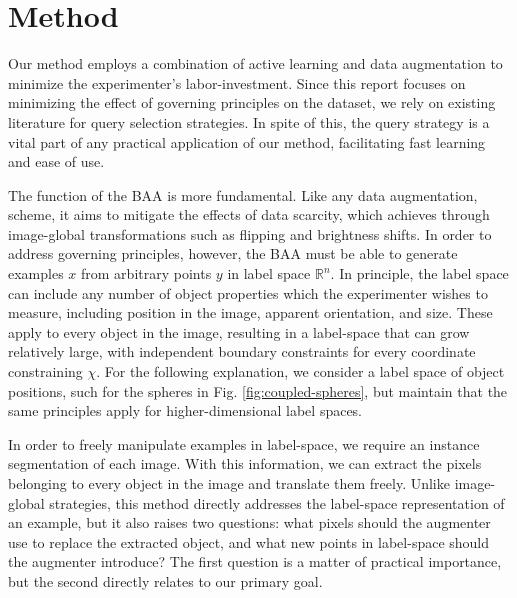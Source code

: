 \documentclass[10pt, journal]{IEEEtran}
\begin{document}
\section{Method}
\label{sec:method}

Our method employs a combination of active learning and data augmentation to
minimize the experimenter's labor-investment. Since this report focuses on
minimizing the effect of governing principles on the dataset, we rely on
existing literature \cite{settles_active_2012, vezhnevets_active_2012} for query
selection strategies. In spite of this, the query strategy is a vital part of
any practical application of our method, facilitating fast learning and ease of
use.

The function of the BAA is more fundamental. Like any data augmentation, scheme,
it aims to mitigate the effects of data scarcity, which
\cite{krizhevsky_imagenet_2012} achieves through image-global transformations
such as flipping and brightness shifts. In order to address governing
principles, however, the BAA must be able to generate examples $x$ from
arbitrary points $y$ in label space $\mathbb{R}^n$. In principle, the label
space can include any number of object properties which the experimenter wishes
to measure, including position in the image, apparent orientation, and
size. These apply to every object in the image, resulting in a label-space that
can grow relatively large, with independent boundary constraints for every
coordinate constraining $\chi$. For the following explanation, we consider a
label space of object positions, such for the spheres in
Fig. \ref{fig:coupled-spheres}, but maintain that the same principles apply for
higher-dimensional label spaces.

In order to freely manipulate examples in label-space, we require an instance
segmentation of each image. With this information, we can extract the pixels
belonging to every object in the image and translate them freely. Unlike
image-global strategies, this method directly addresses the label-space
representation of an example, but it also raises two questions: what pixels
should the augmenter use to replace the extracted object, and what new points in
label-space should the augmenter introduce? The first question is a matter of
practical importance, but the second directly relates to our primary goal.
\end{document}
